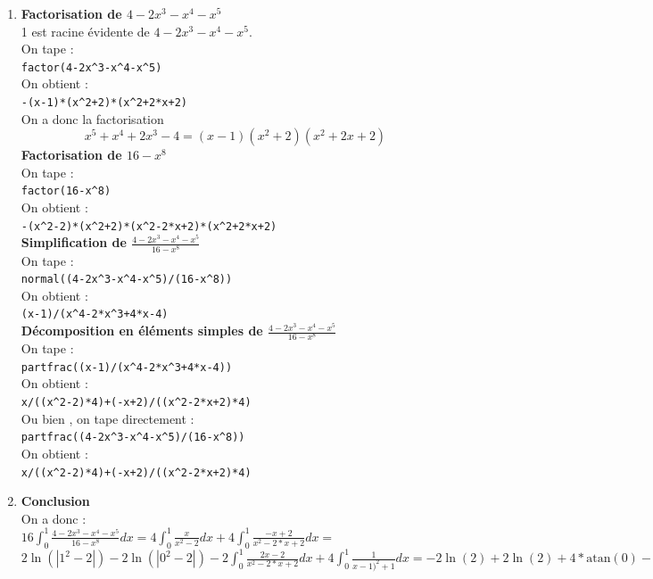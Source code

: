\documentclass[a4paper,11pt]{book}
\newcommand{\atan}{\mbox{atan}}
\begin{document}
\begin{enumerate}
\item {\bf Factorisation de $4-2x^3-x^4-x^5$}\\
1 est racine \'evidente de $4-2x^3-x^4-x^5$.\\
On tape :\\
{\tt factor(4-2x\verb|^|3-x\verb|^|4-x\verb|^|5)}\\
On obtient :\\
{\tt -(x-1)*(x\verb|^|2+2)*(x\verb|^|2+2*x+2)}\\
On a donc la factorisation
$$x^5 + x^4 + 2x^3 -4 = (x-1)(x^2 + 2)(x^2 + 2x + 2)$$
{\bf Factorisation de $16-x^8$}\\
On tape :\\
{\tt factor(16-x\verb|^|8)}\\
On obtient :\\
{\tt -(x\verb|^|2-2)*(x\verb|^|2+2)*(x\verb|^|2-2*x+2)*(x\verb|^|2+2*x+2)}\\
{\bf Simplification de $\displaystyle\frac{4-2x^3-x^4-x^5}{16-x^8}$}\\
On tape :\\
{\tt normal((4-2x\verb|^|3-x\verb|^|4-x\verb|^|5)/(16-x\verb|^|8))}\\
On obtient :\\
{\tt (x-1)/(x\verb|^|4-2*x\verb|^|3+4*x-4)}\\
{\bf D\'ecomposition en \'el\'ements simples de $\displaystyle\frac{4-2x^3-x^4-x^5}{16-x^8}$}\\
On tape :\\
{\tt  partfrac((x-1)/(x\verb|^|4-2*x\verb|^|3+4*x-4))}\\
On obtient :\\
{\tt x/((x\verb|^|2-2)*4)+(-x+2)/((x\verb|^|2-2*x+2)*4)}\\
Ou bien , on tape directement :\\
{\tt partfrac((4-2x\verb|^|3-x\verb|^|4-x\verb|^|5)/(16-x\verb|^|8))}\\
On obtient :\\
{\tt x/((x\verb|^|2-2)*4)+(-x+2)/((x\verb|^|2-2*x+2)*4)}
\item {\bf Conclusion}\\
On a donc :\\
$\displaystyle 16\int_0^1\frac{4-2x^3-x^4-x^5}{16-x^8}dx=4\int_0^1\frac{x}{x^2-2}dx+4\int_0^1\frac{-x+2}{x^2-2*x+2}dx=$\\
$\displaystyle 2\ln(|1^2-2|)-2\ln(|0^2-2|)-2\int_0^1\frac{2x-2}{x^2-2*x+2}dx+4\int_0^1\frac{1}{x-1)^2+1}dx=-2\ln(2)+2\ln(2)+4*\atan(0)-4*\atan(-1)=\pi$\\

\end{enumerate}
\end{document}
